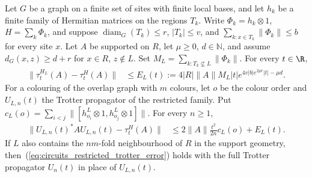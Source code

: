 \begin{theorem}
    \label{thm:circuits_trotter_spatial_error}
    \leanok
    Let $G$ be a graph on a finite set of sites with finite local bases, and let
    $h_k$ be a finite family of Hermitian matrices on the regions $T_k$.
    Write $\Phi_k=h_k\otimes1$, $H=\sum_k\Phi_k$, and suppose
    $\operatorname{diam}_G(T_k)\leq r$, $|T_k|\leq v$, and
    $\sum_{k:x\in T_k}\|\Phi_k\|\leq b$ for every site $x$.
    Let $A$ be supported on $R$, let $\mu\geq0$, $d\in\mathbb N$, and assume
    $d_G(x,z)\geq d+r$ for $x\in R$, $z\notin L$.
    Set $M_L=\sum_{k:T_k\not\subseteq L}\|\Phi_k\|$. For every $t\in\R$,
    \begin{align}
        \label{eq:circuits_truncation_error}
        \|\tau^{H_L}_t(A)-\tau^H_t(A)\|
        &\leq E_L(t):=4|R|\|A\|M_L|t|
            e^{4v|b|e^{2\mu r}|t|-\mu d}.
    \end{align}
    For a colouring of the overlap graph with $m$ colours, let $o$ be the colour
    order and $U_{L,n}(t)$ the Trotter propagator of the restricted family.
    Put $c_L(o)=\sum_{i<j}\|[h^L_{o_i}\otimes1,h^L_{o_j}\otimes1]\|$.
    For every $n\geq1$,
    \begin{align}
        \label{eq:circuits_restricted_trotter_error}
        \|U_{L,n}(t)^*AU_{L,n}(t)-\tau^H_t(A)\|
        &\leq 2\|A\|\frac{t^2}{2n}c_L(o)+E_L(t).
    \end{align}
    If $L$ also contains the $nm$-fold neighbourhood of $R$ in the support
    geometry, then~(\ref{eq:circuits_restricted_trotter_error}) holds with the full
    Trotter propagator $U_n(t)$ in place of $U_{L,n}(t)$.
\end{theorem}
